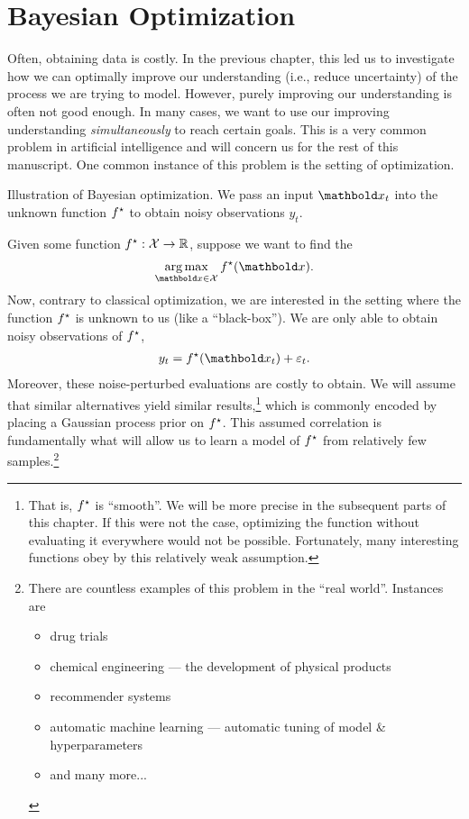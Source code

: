 \chapter{Bayesian Optimization}\label{sec:bayesian_optimization}

Often, obtaining data is costly.
In the previous chapter, this led us to investigate how we can optimally improve our understanding (i.e., reduce uncertainty) of the process we are trying to model.
However, purely improving our understanding is often not good enough.
In many cases, we want to use our improving understanding \emph{simultaneously} to reach certain goals.
This is a very common problem in artificial intelligence and will concern us for the rest of this manuscript.
One common instance of this problem is the setting of optimization.

\begin{marginfigure}
  \caption{Illustration of Bayesian optimization. We pass an input $\vx_t$ into the unknown function $f^\star$ to obtain noisy observations $y_t$.}
\end{marginfigure}

Given some function $f^\star : \mathcal{X} \to \mathbb{R}$, suppose we want to find the \begin{align}
  \argmax_{\vx \in \spX} \opt{f}(\vx).
\end{align}
Now, contrary to classical optimization, we are interested in the setting where the function $f^\star$ is unknown to us (like a ``black-box'').
We are only able to obtain noisy observations of $f^\star$, \begin{align}
  y_t = \opt{f}(\vx_t) + \varepsilon_t.
\end{align}
Moreover, these noise-perturbed evaluations are costly to obtain.
We will assume that similar alternatives yield similar results,\footnote{That is, $f^\star$ is ``smooth''. We will be more precise in the subsequent parts of this chapter. If this were not the case, optimizing the function without evaluating it everywhere would not be possible. Fortunately, many interesting functions obey by this relatively weak assumption.} which is commonly encoded by placing a Gaussian process prior on $f^\star$.
This assumed correlation is fundamentally what will allow us to learn a model of $f^\star$ from relatively few samples.\footnote{There are countless examples of this problem in the ``real world''. Instances are \begin{itemize}
  \item drug trials
  \item chemical engineering --- the development of physical products
  \item recommender systems
  \item automatic machine learning --- automatic tuning of model \& hyperparameters
  \item and many more...
\end{itemize}}

